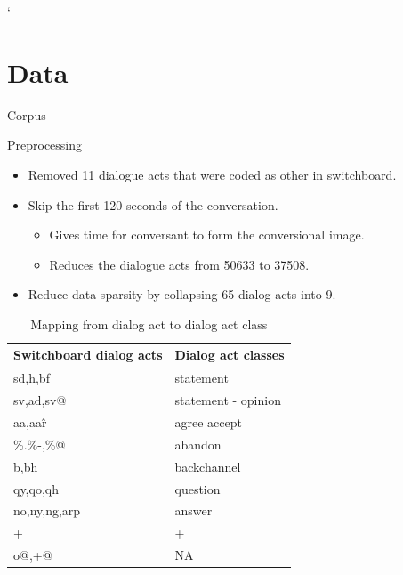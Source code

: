 `%

\section{Data}
\frame{\sectionpage}


\begin{frame}{Corpus}
\end{frame}{}

\begin{frame}{Preprocessing}
 \begin{itemize}
    \item Removed 11 dialogue acts that were coded as other in switchboard.
    \item Skip the first 120 seconds of the conversation.
      \begin{itemize}
      \item Gives time for conversant to form the conversional image.
      \item Reduces the dialogue acts from 50633 to 37508.
      \end{itemize}
    \item Reduce data sparsity by collapsing 65 dialog acts into 9.
  \end{itemize}

  \begin{table}
     \begin{center}
     \begin{tabular}{l | l}
    \hline
Switchboard dialog acts &  Dialog act classes  \\
    \hline
sd,h,bf      & statement   \\
sv,ad,sv@    & statement - opinion  \\
aa,aa\^r     & agree accept \\
\%.\%-,\%@   & abandon      \\
b,bh         & backchannel  \\
qy,qo,qh     & question     \\
no,ny,ng,arp & answer       \\
+            & +            \\
o@,+@        & NA           \\
  \hline
\end{tabular}
\end{center}\vspace{-0.5em}
\caption{Mapping from dialog act to dialog act class}
\label{tab:mapping}
\end{table}

\end{frame}{}


